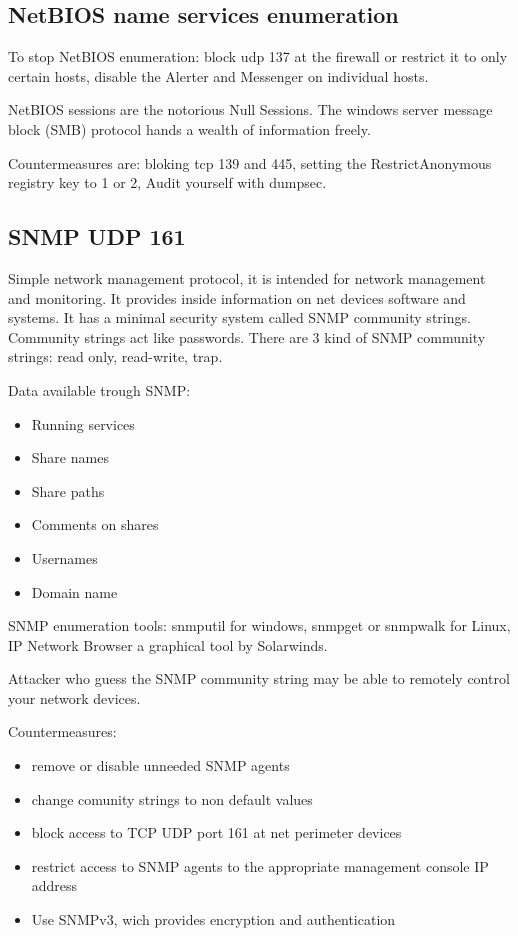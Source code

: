 \subsection{NetBIOS name services enumeration}
To stop NetBIOS enumeration: block udp 137 at the firewall or restrict it to only certain hosts, disable the Alerter and Messenger on individual hosts.

NetBIOS sessions are the notorious Null Sessions. The windows server message block (SMB) protocol hands a wealth of information freely.

Countermeasures are: bloking tcp 139 and 445, setting the RestrictAnonymous registry key to 1 or 2, Audit yourself with dumpsec.

\subsection{SNMP UDP 161}
Simple network management protocol, it is intended for network management and monitoring. It provides inside information on net devices software and systems. It has a minimal security system called SNMP community strings. Community strings act like passwords. There are 3 kind of SNMP community strings: read only, read-write, trap.

Data available trough SNMP:
\begin{itemize}
    \item Running services
    \item Share names
    \item Share paths
    \item Comments on shares
    \item Usernames
    \item Domain name
\end{itemize}

SNMP enumeration tools: snmputil for windows, snmpget or snmpwalk for Linux, IP Network Browser a graphical tool by Solarwinds.

Attacker who guess the SNMP community string may be able to remotely control your network devices.

Countermeasures:
\begin{itemize}
    \item remove or disable unneeded SNMP agents
    \item change comunity strings to non default values 
    \item block access to TCP UDP port 161 at net perimeter devices
    \item restrict access to SNMP agents to the appropriate management console IP address
    \item Use SNMPv3, wich provides encryption and authentication
\end{itemize}

